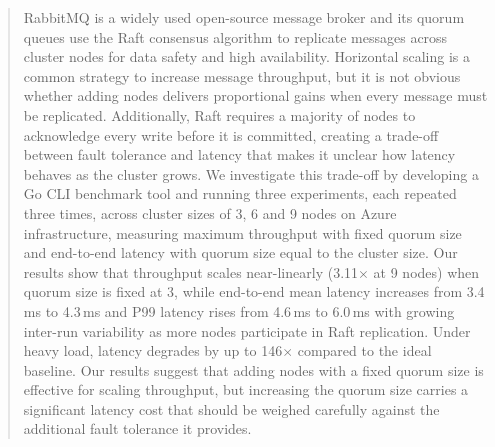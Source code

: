 \begin{abstract}
RabbitMQ is a widely used open-source message broker and its quorum queues use the Raft consensus algorithm to replicate messages across cluster nodes for data safety and high availability. Horizontal scaling is a common strategy to increase message throughput, but it is not obvious whether adding nodes delivers proportional gains when every message must be replicated. Additionally, Raft requires a majority of nodes to acknowledge every write before it is committed, creating a trade-off between fault tolerance and latency that makes it unclear how latency behaves as the cluster grows. We investigate this trade-off by developing a Go CLI benchmark tool and running three experiments, each repeated three times, across cluster sizes of 3, 6 and 9 nodes on Azure infrastructure, measuring maximum throughput with fixed quorum size and end-to-end latency with quorum size equal to the cluster size. Our results show that throughput scales near-linearly (3.11$\times$ at 9 nodes) when quorum size is fixed at 3, while end-to-end mean latency increases from 3.4\,ms to 4.3\,ms and P99 latency rises from 4.6\,ms to 6.0\,ms with growing inter-run variability as more nodes participate in Raft replication. Under heavy load, latency degrades by up to 146$\times$ compared to the ideal baseline. Our results suggest that adding nodes with a fixed quorum size is effective for scaling throughput, but increasing the quorum size carries a significant latency cost that should be weighed carefully against the additional fault tolerance it provides.
\end{abstract}
